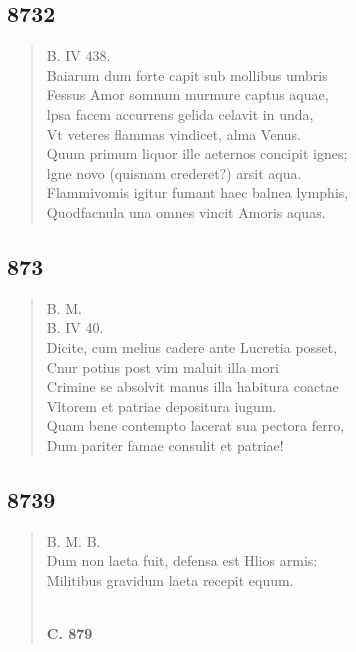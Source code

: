 \documentclass[11pt, a4paper]{report}
\begin{document}
            \subsection*{8732}
      \begin{verse}
      B. IV 438. \\ Baiarum dum forte capit sub mollibus umbris \\ Fessus Amor somnum murmure captus aquae, \\ lpsa facem accurrens gelida celavit in unda, \\ Vt veteres flammas vindicet, alma Venus. \\ Quum primum liquor ille aeternos concipit ignes; \\ lgne novo (quisnam crederet?) arsit aqua. \\ Flammivomis igitur fumant haec balnea lymphis, \\ Quodfacnula una omnes vincit Amoris aquas. \\ 
      \end{verse}
  
            \subsection*{873}
      \begin{verse}
      B. M. \\ B. IV 40. \\ Dicite, cum melius cadere ante Lucretia posset, \\ Cnur potius post vim maluit illa mori \\ Crimine se absolvit manus illa habitura coactae \\ Vltorem et patriae depositura iugum. \\ Quam bene contempto lacerat sua pectora ferro, \\ Dum pariter famae consulit et patriae! \\ 
      \end{verse}
  
            \subsection*{8739}
      \begin{verse}
      B. M. B. \\ Dum non laeta fuit, defensa est Hlios armis: \\ Militibus gravidum laeta recepit equum. \\ 
        ﻿\pagebreak 
    \begin{center} \textbf{C. 879} \end{center} \marginpar{[320]} 
      \end{verse}
  
\end{document}
